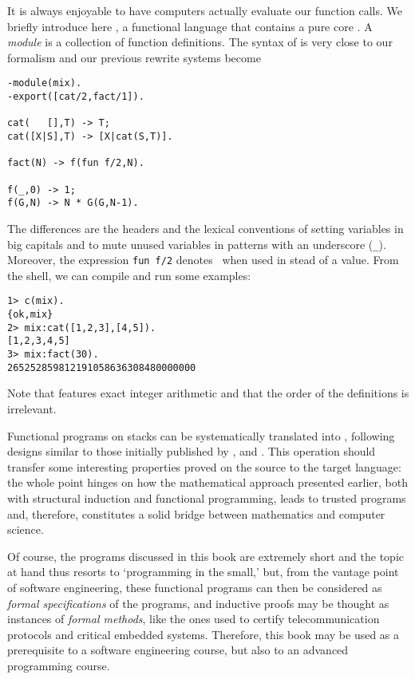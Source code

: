 
It is always enjoyable to have computers actually evaluate our
function calls. We briefly introduce here \Erlang, a functional
language that contains a pure core \citep{Armstrong_2007}. A
\emph{module} is a collection of function definitions. The syntax of
\Erlang is very close to our formalism and our previous rewrite
systems become
\begin{verbatim}
-module(mix).
-export([cat/2,fact/1]).

cat(   [],T) -> T;
cat([X|S],T) -> [X|cat(S,T)].

fact(N) -> f(fun f/2,N).

f(_,0) -> 1;
f(G,N) -> N * G(G,N-1).
\end{verbatim}
The differences are the headers and the lexical conventions of setting
variables in big capitals and to mute unused variables in patterns
with an underscore (\verb|_|). Moreover, the expression \verb|fun f/2|
denotes~ when used in stead of a value. From the \Erlang
shell, we can compile and run some examples:
\begin{verbatim}
1> c(mix).
{ok,mix}
2> mix:cat([1,2,3],[4,5]).
[1,2,3,4,5]
3> mix:fact(30).
265252859812191058636308480000000
\end{verbatim}
Note that \Erlang features exact integer arithmetic and that the order
of the definitions is irrelevant.

\label{par:java}

Functional programs on stacks can be systematically translated into
\Java, following designs similar to those initially published
by \cite{FelleisenFriedman_1997}, \cite{Bloch_2003}
and \cite{Sher_2004}. This operation should transfer some interesting
properties proved on the source to the target language: the whole
point hinges on how the mathematical approach presented earlier, both
with structural induction and functional programming, leads to trusted
\Java programs and, therefore, constitutes a solid bridge between
mathematics and computer science.

Of course, the programs discussed in this book are extremely short and
the topic at hand thus resorts to `programming in the small,' but,
from the vantage point of software engineering, these functional
programs can then be considered as \emph{formal specifications} of the
\Java programs, and inductive proofs may be thought as instances of
\emph{formal methods}, like the ones used to certify telecommunication
protocols and critical embedded systems. Therefore, this book may be
used as a prerequisite to a software engineering course, but also to
an advanced programming course.


